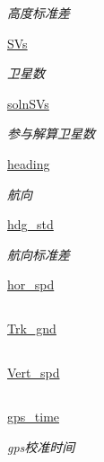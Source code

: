 \begin{DoxyCompactItemize}
\begin{DoxyCompactList}\small\item\em 高度标准差 \end{DoxyCompactList}\item 
\hyperlink{classserial__af_1_1_g_p_s_a73a15f458e0f7b31ea6478880d69d283}{S\+Vs}
\begin{DoxyCompactList}\small\item\em 卫星数 \end{DoxyCompactList}\item 
\hyperlink{classserial__af_1_1_g_p_s_a3bfc6f499ab8b20433db17b6f396a443}{soln\+S\+Vs}
\begin{DoxyCompactList}\small\item\em 参与解算卫星数 \end{DoxyCompactList}\item 
\hyperlink{classserial__af_1_1_g_p_s_afa99bb0e4bf2d9f562f8dcd5272968ab}{heading}
\begin{DoxyCompactList}\small\item\em 航向 \end{DoxyCompactList}\item 
\hyperlink{classserial__af_1_1_g_p_s_aa20f5f2a59134550e4b473182bb03617}{hdg\+\_\+std}
\begin{DoxyCompactList}\small\item\em 航向标准差 \end{DoxyCompactList}\item 
\hyperlink{classserial__af_1_1_g_p_s_ad35c61f523a2d9735d4fbeb1e560d203}{hor\+\_\+spd}
\begin{DoxyCompactList}\small\item\em \subsection*{}\end{DoxyCompactList}\item 
\hyperlink{classserial__af_1_1_g_p_s_a7d0d2e28362524f5db97acf34484480a}{Trk\+\_\+gnd}
\begin{DoxyCompactList}\small\item\em \subsection*{}\end{DoxyCompactList}\item 
\hyperlink{classserial__af_1_1_g_p_s_a56b941265fe961948501d6e9891fb206}{Vert\+\_\+spd}
\begin{DoxyCompactList}\small\item\em \subsection*{}\end{DoxyCompactList}\item 
\hyperlink{classserial__af_1_1_g_p_s_aabf831d335b687b5eb7dd097bc0fde05}{gps\+\_\+time}
\begin{DoxyCompactList}\small\item\em gps校准时间 \end{DoxyCompactList}\end{DoxyCompactItemize}


